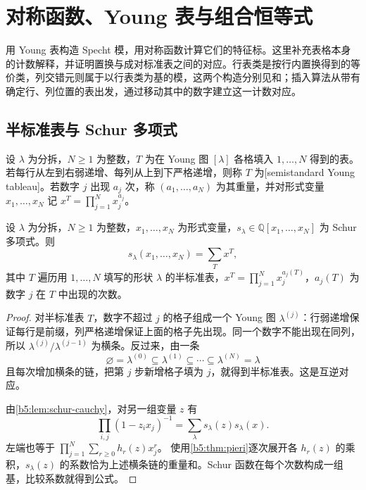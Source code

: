 %
%
\section{对称函数、Young 表与组合恒等式}
\label{b5:sec:A02}

用 Young 表构造 Specht 模，用对称函数计算它们的特征标。这里补充表格本身的计数解释，并证明置换与成对标准表之间的对应。行表类是按行内置换得到的等价类，列交错元则属于以行表类为基的模，这两个构造分别见和；插入算法从带有确定行、列位置的表出发，通过移动其中的数字建立这一计数对应。

\subsection{半标准表与 Schur 多项式}
\label{b5:subsec:A02:01}

\begin{definition}\label{b5:def:semistandard-tableau}
	设 \(\lambda\) 为分拆，\(N\ge1\) 为整数，\(T\) 为在 Young 图 \([\lambda]\) 各格填入 \(1,\ldots,N\) 得到的表。若每行从左到右弱递增、每列从上到下严格递增，则称 \(T\) 为[semistandard Young tableau]。若数字 \(j\) 出现 \(a_j\) 次，称 \((a_1,\ldots,a_N)\) 为其重量，并对形式变量 \(x_1,\ldots,x_N\) 记 \(x^T=\prod_{j=1}^Nx_j^{a_j}\)。
\end{definition}

\begin{proposition}\label{b5:prop:schur-tableau-expansion}
	设 \(\lambda\) 为分拆，\(N\ge1\) 为整数，\(x_1,\ldots,x_N\) 为形式变量，\(s_\lambda\in\mathbb Q[x_1,\ldots,x_N]\) 为 Schur 多项式。则
	\[
		s_\lambda(x_1,\ldots,x_N)=\sum_T x^T,
	\]
	其中 \(T\) 遍历用 \(1,\ldots,N\) 填写的形状 \(\lambda\) 的半标准表，\(x^T=\prod_{j=1}^Nx_j^{a_j(T)}\)，\(a_j(T)\) 为数字 \(j\) 在 \(T\) 中出现的次数。
\end{proposition}
\begin{proof}
	对半标准表 \(T\)，数字不超过 \(j\) 的格子组成一个 Young 图 \(\lambda^{(j)}\)：行弱递增保证每行是前缀，列严格递增保证上面的格子先出现。同一个数字不能出现在同列，所以 \(\lambda^{(j)}/\lambda^{(j-1)}\) 为横条。反过来，由一条
	\[
		\varnothing=\lambda^{(0)}\subseteq\lambda^{(1)} \subseteq\cdots\subseteq\lambda^{(N)}=\lambda
	\]
	且每次增加横条的链，把第 \(j\) 步新增格子填为 \(j\)，就得到半标准表。这是互逆对应。

	由\cref{b5:lem:schur-cauchy}，对另一组变量 \(z\) 有
	\[
		\prod_{i,j}(1-z_ix_j)^{-1} =\sum_\lambda s_\lambda(z)s_\lambda(x).
	\]
	左端也等于 \(\prod_{j=1}^N\sum_{r\ge0}h_r(z)x_j^r\)。 使用\cref{b5:thm:pieri}逐次展开各 \(h_r(z)\) 的乘积，\(s_\lambda(z)\) 的系数恰为上述横条链的重量和。Schur 函数在每个次数构成一组基，比较系数就得到公式。
\end{proof}

